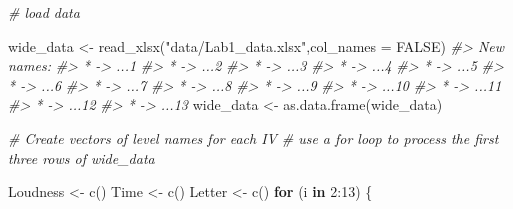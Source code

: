 \documentclass[
]{book}
\newenvironment{Shaded}{\begin{snugshade}}{\end{snugshade}}
\newcommand{\AttributeTok}[1]{\textcolor[rgb]{0.77,0.63,0.00}{#1}}
\newcommand{\CommentTok}[1]{\textcolor[rgb]{0.56,0.35,0.01}{\textit{#1}}}
\newcommand{\ConstantTok}[1]{\textcolor[rgb]{0.00,0.00,0.00}{#1}}
\newcommand{\ControlFlowTok}[1]{\textcolor[rgb]{0.13,0.29,0.53}{\textbf{#1}}}
\newcommand{\DecValTok}[1]{\textcolor[rgb]{0.00,0.00,0.81}{#1}}
\newcommand{\FunctionTok}[1]{\textcolor[rgb]{0.00,0.00,0.00}{#1}}
\newcommand{\NormalTok}[1]{#1}
\newcommand{\OtherTok}[1]{\textcolor[rgb]{0.56,0.35,0.01}{#1}}
\newcommand{\SpecialCharTok}[1]{\textcolor[rgb]{0.00,0.00,0.00}{#1}}
\newcommand{\StringTok}[1]{\textcolor[rgb]{0.31,0.60,0.02}{#1}}
\theoremstyle{definition}
\theoremstyle{definition}
\theoremstyle{definition}
\theoremstyle{definition}
\theoremstyle{remark}
\begin{document}
\begin{Shaded}
\begin{Highlighting}[]
\CommentTok{\# load data}

\NormalTok{wide\_data }\OtherTok{\textless{}{-}} \FunctionTok{read\_xlsx}\NormalTok{(}\StringTok{"data/Lab1\_data.xlsx"}\NormalTok{,}\AttributeTok{col\_names =} \ConstantTok{FALSE}\NormalTok{)}
\CommentTok{\#\textgreater{} New names:}
\CommentTok{\#\textgreater{} * \textasciigrave{}\textasciigrave{} {-}\textgreater{} \textasciigrave{}...1\textasciigrave{}}
\CommentTok{\#\textgreater{} * \textasciigrave{}\textasciigrave{} {-}\textgreater{} \textasciigrave{}...2\textasciigrave{}}
\CommentTok{\#\textgreater{} * \textasciigrave{}\textasciigrave{} {-}\textgreater{} \textasciigrave{}...3\textasciigrave{}}
\CommentTok{\#\textgreater{} * \textasciigrave{}\textasciigrave{} {-}\textgreater{} \textasciigrave{}...4\textasciigrave{}}
\CommentTok{\#\textgreater{} * \textasciigrave{}\textasciigrave{} {-}\textgreater{} \textasciigrave{}...5\textasciigrave{}}
\CommentTok{\#\textgreater{} * \textasciigrave{}\textasciigrave{} {-}\textgreater{} \textasciigrave{}...6\textasciigrave{}}
\CommentTok{\#\textgreater{} * \textasciigrave{}\textasciigrave{} {-}\textgreater{} \textasciigrave{}...7\textasciigrave{}}
\CommentTok{\#\textgreater{} * \textasciigrave{}\textasciigrave{} {-}\textgreater{} \textasciigrave{}...8\textasciigrave{}}
\CommentTok{\#\textgreater{} * \textasciigrave{}\textasciigrave{} {-}\textgreater{} \textasciigrave{}...9\textasciigrave{}}
\CommentTok{\#\textgreater{} * \textasciigrave{}\textasciigrave{} {-}\textgreater{} \textasciigrave{}...10\textasciigrave{}}
\CommentTok{\#\textgreater{} * \textasciigrave{}\textasciigrave{} {-}\textgreater{} \textasciigrave{}...11\textasciigrave{}}
\CommentTok{\#\textgreater{} * \textasciigrave{}\textasciigrave{} {-}\textgreater{} \textasciigrave{}...12\textasciigrave{}}
\CommentTok{\#\textgreater{} * \textasciigrave{}\textasciigrave{} {-}\textgreater{} \textasciigrave{}...13\textasciigrave{}}
\NormalTok{wide\_data }\OtherTok{\textless{}{-}} \FunctionTok{as.data.frame}\NormalTok{(wide\_data)}

\CommentTok{\# Create vectors of level names for each IV}
\CommentTok{\# use a for loop to process the first three rows of wide\_data}

\NormalTok{Loudness }\OtherTok{\textless{}{-}} \FunctionTok{c}\NormalTok{()}
\NormalTok{Time }\OtherTok{\textless{}{-}} \FunctionTok{c}\NormalTok{()}
\NormalTok{Letter }\OtherTok{\textless{}{-}} \FunctionTok{c}\NormalTok{()}
\ControlFlowTok{for}\NormalTok{ (i }\ControlFlowTok{in} \DecValTok{2}\SpecialCharTok{:}\DecValTok{13}\NormalTok{) \{}
  

\end{Highlighting}
\end{Shaded}
\end{document}
